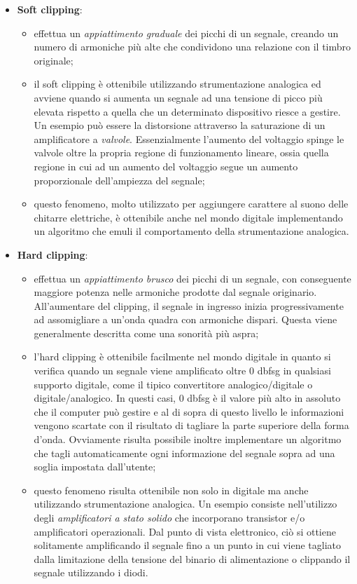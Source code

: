 \begin{itemize}
    \item \textbf{Soft clipping}:
        \begin{itemize}
            \item effettua un \textit{appiattimento graduale} dei picchi di un segnale, creando un numero di armoniche più alte che condividono una relazione con il timbro originale;
            \item il soft clipping è ottenibile utilizzando strumentazione analogica ed avviene quando si aumenta un segnale ad una tensione di picco più elevata rispetto a quella che un determinato dispositivo riesce a gestire. Un esempio può essere la distorsione attraverso la saturazione di un amplificatore a \textit{valvole}. Essenzialmente l'aumento del voltaggio spinge le valvole oltre la propria regione di funzionamento lineare, ossia quella regione in cui ad un aumento del voltaggio segue un aumento proporzionale dell'ampiezza del segnale;
            \item questo fenomeno, molto utilizzato per aggiungere carattere al suono delle chitarre elettriche, è ottenibile anche nel mondo digitale implementando un algoritmo che emuli il comportamento della strumentazione analogica. 
        \end{itemize}
    \item \textbf{Hard clipping}:
        \begin{itemize}
            \item effettua un \textit{appiattimento brusco} dei picchi di un segnale, con conseguente maggiore potenza nelle armoniche prodotte dal segnale originario. All'aumentare del clipping, il segnale in ingresso inizia progressivamente ad assomigliare a un'onda quadra con armoniche dispari. Questa viene generalmente descritta come una sonorità più aspra;
            \item l'hard clipping è ottenibile facilmente nel mondo digitale in quanto si verifica quando un segnale viene amplificato oltre 0 \gls{dbfsg} in qualsiasi supporto digitale, come il tipico convertitore analogico/digitale o digitale/analogico. In questi casi, 0 \gls{dbfsg} è il valore più alto in assoluto che il computer può gestire e al di sopra di questo livello le informazioni vengono scartate con il risultato di tagliare la parte superiore della forma d'onda. Ovviamente risulta possibile inoltre implementare un algoritmo che tagli automaticamente ogni informazione del segnale sopra ad una soglia impostata dall'utente;
            \item questo fenomeno risulta ottenibile non solo in digitale ma anche utilizzando strumentazione analogica. Un esempio consiste nell'utilizzo degli \textit{amplificatori a stato solido} che incorporano transistor e/o amplificatori operazionali. Dal punto di vista elettronico, ciò si ottiene solitamente amplificando il segnale fino a un punto in cui viene tagliato dalla limitazione della tensione del binario di alimentazione o clippando il segnale utilizzando i diodi.
        \end{itemize}
\end{itemize}
